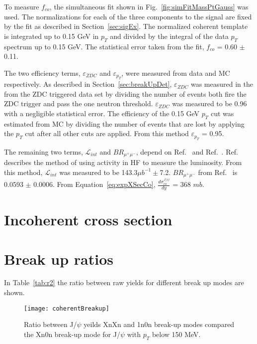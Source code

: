   To measure $f_{co}$, the simultaneous fit shown in 
    Fig.~\ref{fig:simFitMassPtGauss} was used.
  The normalizations for each of the three components to the signal are fixed 
  by the fit as described in Section~\ref{sec:sigEx}.
  The normalized coherent template is integrated up to 0.15 GeV in $p_{T}$ and
    divided by the integral of the data $p_{T}$ spectrum up to 0.15 GeV.
  The statistical error taken from the fit, $f_{co}$ = 0.60 $\pm$ 0.11.

  The two efficiency terms, $\varepsilon_{ZDC}$ and $\varepsilon_{p_{T}}$, were
    measured from data and MC respectively.
  As described in Section~\ref{sec:breakUpDet}, $\varepsilon_{ZDC}$ was 
    measured in the from the ZDC triggered data set by dividing the number of 
    events both fire the ZDC trigger and pass the one neutron threshold.
  $\varepsilon_{ZDC}$ was measured to be 0.96 with a negligible statistical 
    error.
  The efficiency of the 0.15 GeV $p_{T}$ cut was estimated from MC by dividing 
    the number of events that are lost by applying the $p_{T}$ cut after all
    other cuts are applied. 
  From this method $\varepsilon_{p_{T}}$ = 0.95.
  
  The remaining two terms, $\mathcal{L}_{int}$ and $BR_{\mu^{+}\mu^{-}}$, 
    depend on Ref.~\cite{cmsLumi} and Ref.~\cite{pdg}.
  Ref.~\cite{cmsLumi} describes the method of using activity in HF to measure 
    the luminosity. 
  From this method, $\mathcal{L}_{int}$ was measured to be 143.3$\mu b^{-1}\pm$7.2.
  $BR_{\mu^{+}\mu^{-}}$ from Ref.~\cite{pdg} is 0.0593 $\pm$ 0.0006.
  From Equation~\ref{eq:expXSecCo}, $\frac{d\sigma^{J/\psi}_{co}}{dy}$ = 368 $mb$.

  \section{Incoherent cross section}
  \section{Break up ratios}
    In Table~\ref{tab:r2} the ratio between raw yields for different break up 
      modes are shown.
    \begin{figure}[!Hhtb]
      \centering
      \texttt{[image: coherentBreakup]}
      \caption{Ratio between J/$\psi$ yeilds XnXn and 1n0n break-up modes 
        compared the Xn0n break-up mode for J/$\psi$ with $p_{T}$ below 150 
        MeV.}
      \label{fig:coherentBreakUp}
    \end{figure}
   
